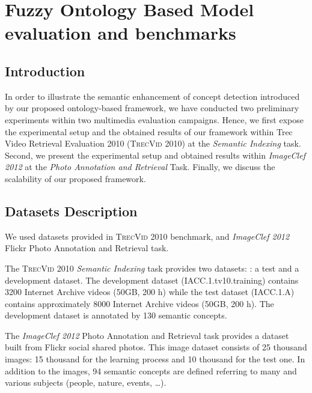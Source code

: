 \chapter{Fuzzy Ontology Based Model evaluation and benchmarks} 

\section{Introduction}
		In order to illustrate the semantic enhancement of concept detection introduced 
		by our proposed ontology-based framework, we have conducted two preliminary experiments within two 
		multimedia evaluation campaigns. Hence, we first expose the experimental setup and the 
		obtained results of our framework within Trec Video Retrieval Evaluation 2010 (\textsc{TrecVid 2010}) 
		\cite{Over2010} at the \textit{Semantic Indexing} task.
		Second, we present the experimental setup and obtained results within \textit{ImageClef 2012} \cite{Thomee2012}
		at the \textit{Photo Annotation and Retrieval} Task. 
		Finally, we discuss the scalability of our proposed framework.

		\section{Datasets Description}
		We used datasets provided 
		in \textsc{TrecVid 2010} benchmark, and \textit{ImageClef 2012} Flickr Photo 
		Annotation and Retrieval task.

		The \textsc{TrecVid 2010} \textit{Semantic Indexing} task provides two datasets:
		: a test and a development dataset. 
		The development dataset (IACC.1.tv10.training) contains 3200 Internet Archive videos 
		(50GB, 200 h) while the test dataset (IACC.1.A) contains approximately 8000 Internet 
		Archive videos (50GB, 200 h). The development dataset is annotated by 130 semantic concepts.

		The \textit{ImageClef 2012} Photo Annotation and Retrieval task provides a dataset built from
		Flickr social shared photos. This image dataset consists of 25 thousand images:
		15 thousand for the learning process and 10 thousand for the test one. In addition
		to the images, 94 semantic concepts are defined referring to many and various 
		subjects (people, nature, events, \dots). 

